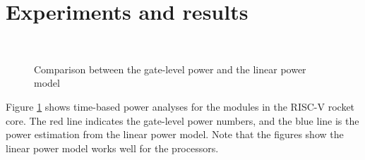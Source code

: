 \section{Experiments and results}

\begin{figure}
	\centering
	\\
	\caption{Comparison between the gate-level power and the linear power model}
	\label{fig:power}
\end{figure}

Figure \ref{fig:power} shows time-based power analyses for the modules in the RISC-V rocket core.
The red line indicates the gate-level power numbers, and the blue line is the power estimation from the linear power model.
Note that the figures show the linear power model works well for the processors.

